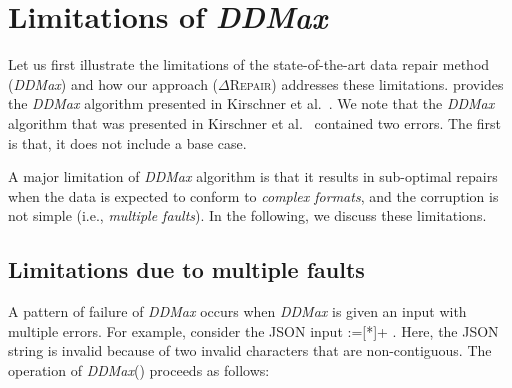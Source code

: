 \documentclass[acmsmall,screen,review,anonymous]{acmart}
\makeatletter
\newcommand{\dtask}{data repair\xspace}
\newcommand{\approach}{\textsc{$\Delta$Repair}\xspace}
\newcommand{\ddmax}{\textit{DDMax}\xspace}
\newcommand\letterboxed[1]{%
\setlength{\fboxsep}{0pt}%
  \@tfor\@ii:=#1\do{%
    \fcolorbox{white}{light-gray}{\texttt{\strut\@ii}}%
  }%
}
\makeatother
\begin{document}
\section{Limitations of \ddmax}
\label{sec:rich-input-structures}

Let us first illustrate the limitations of the state-of-the-art \dtask method (\ddmax)
 and how our approach (\approach) addresses these limitations.
 provides the \ddmax algorithm
presented in Kirschner et al.~\cite{kirschner2020debugging}.
We note that the \ddmax algorithm that was presented in
Kirschner et al.~\cite{kirschner2020debugging} contained two errors.
The first is that, it does not include a base case. 

A major limitation of \ddmax algorithm is that it results in sub-optimal
repairs when the data is expected to conform to \textit{complex formats},
and the corruption is not simple (i.e., \textit{multiple faults}).
In the following, we discuss these limitations.

\subsection{Limitations due to multiple faults}
A pattern of failure of \ddmax occurs when \ddmax is given an input with
multiple errors.  For example, consider the JSON input \letterboxed{[*]+}.
Here, the JSON string is invalid because of two invalid characters that are
non-contiguous. The operation of \ddmax () proceeds as follows:
\end{document}
